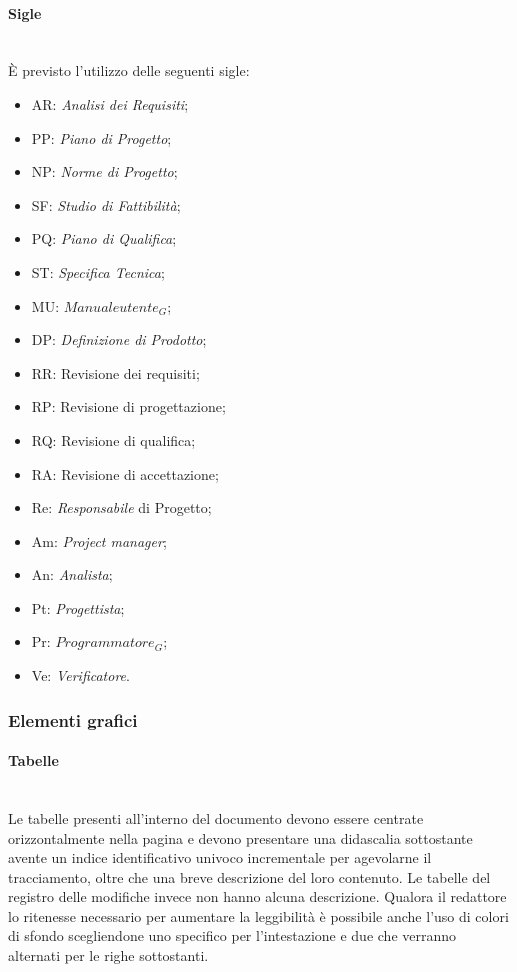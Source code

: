 		\paragraph{Sigle} \mbox{} \\
		È previsto l’utilizzo delle seguenti sigle:
		\begin{itemize}
			\item AR: \textit{Analisi dei Requisiti};
			\item PP: \textit{Piano di Progetto};
			\item NP: \textit{Norme di Progetto};
			\item SF: \textit{Studio di Fattibilità};
			\item PQ: \textit{Piano di Qualifica};
			\item ST: \textit{Specifica Tecnica};
			\item MU: \textit{$Manuale utente_G$};	
			\item DP: \textit{Definizione di Prodotto};
			\item RR: Revisione dei requisiti;
			\item RP: Revisione di progettazione;
			\item RQ: Revisione di qualifica;
			\item RA: Revisione di accettazione;
			\item Re: \textit{Responsabile} di Progetto;
			\item Am: \textit{Project manager};
			\item An: \textit{Analista};
			\item Pt: \textit{Progettista};
			\item Pr: \textit{$Programmatore_G$};
			\item Ve: \textit{Verificatore}.
		\end{itemize}
		
	\subsubsection{Elementi grafici}
		\paragraph{Tabelle}\mbox{} \\
		Le tabelle presenti all'interno del documento devono essere centrate orizzontalmente nella pagina e devono presentare una didascalia sottostante avente un indice identificativo univoco incrementale per agevolarne il tracciamento, oltre che una breve descrizione del loro contenuto.
		Le tabelle del registro delle modifiche invece non hanno alcuna descrizione.
Qualora il redattore lo ritenesse necessario per aumentare la leggibilità è possibile anche l'uso di colori di sfondo scegliendone uno specifico per l'intestazione e due che verranno alternati per le righe sottostanti.


